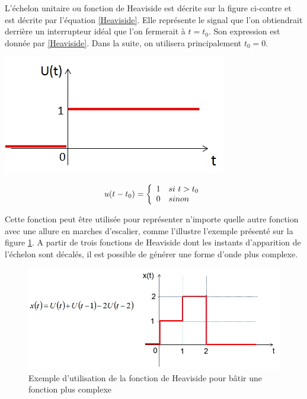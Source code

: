 	\begin{minipage}[l]{0.7\linewidth}
		L'échelon unitaire ou fonction de Heaviside est décrite sur la figure ci-contre et est décrite par l'équation \ref{Heaviside}. Elle représente le signal que l'on obtiendrait derrière un interrupteur
		idéal que l'on fermerait à $t = t_{0}$. Son expression est donnée par \ref{Heaviside}. Dans la suite, on utilisera principalement $t_{0} = 0$.	
	\end{minipage} \hfill
	\begin{minipage}[r]{0.4\linewidth}
		\includegraphics[scale=0.5]{images/Heaviside.jpg} 	
	\end{minipage}
	 
	\begin{equation}\label{Heaviside}
	u(t-t_{0}) = \left \{
	\begin{array}{l l}
	1  & si~t>t_{0} \\
	0   & sinon \\
	\end{array}
	\right .	 	
	\end{equation}
	
	
	Cette fonction peut être utilisée pour représenter n'importe quelle autre fonction avec une allure en marches d'escalier, comme l'illustre l'exemple présenté sur la figure \ref{Fig:Utilisation_Heaviside}. A partir de trois fonctions de Heaviside dont les instants d'apparition de l'échelon sont décalés, il est possible de générer une forme d'onde plus complexe.
	\begin{figure}[h!]
		\centering
		\includegraphics[scale=0.5]{images/Utilisation_Heaviside.jpg} 
		\caption{Exemple d'utilisation de la fonction de Heaviside pour bâtir une fonction plus complexe}	
		\label{Fig:Utilisation_Heaviside}
	\end{figure}
	
